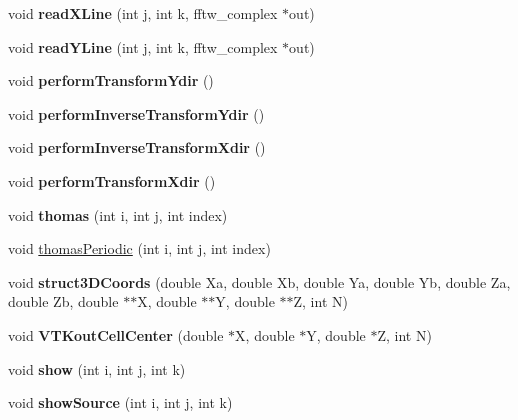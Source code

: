 \begin{DoxyCompactItemize}
\item 
\hypertarget{classFourier_ad1c692b8f1673a4dadc6d313e50be4a2}{void {\bfseries read\-X\-Line} (int j, int k, fftw\-\_\-complex $\ast$out)}\label{classFourier_ad1c692b8f1673a4dadc6d313e50be4a2}

\item 
\hypertarget{classFourier_a2bd51e53f51e649e90d9386858e8f759}{void {\bfseries read\-Y\-Line} (int j, int k, fftw\-\_\-complex $\ast$out)}\label{classFourier_a2bd51e53f51e649e90d9386858e8f759}

\item 
\hypertarget{classFourier_a1a54dd2621780ba38c3336c4bfed4ac5}{void {\bfseries perform\-Transform\-Ydir} ()}\label{classFourier_a1a54dd2621780ba38c3336c4bfed4ac5}

\item 
\hypertarget{classFourier_aeae4df419baa831f440cc4c0e5287c18}{void {\bfseries perform\-Inverse\-Transform\-Ydir} ()}\label{classFourier_aeae4df419baa831f440cc4c0e5287c18}

\item 
\hypertarget{classFourier_a2c0b90f7b858848a6890e6803e45116a}{void {\bfseries perform\-Inverse\-Transform\-Xdir} ()}\label{classFourier_a2c0b90f7b858848a6890e6803e45116a}

\item 
\hypertarget{classFourier_a41a47f2ab875bbc6664d456fed64284d}{void {\bfseries perform\-Transform\-Xdir} ()}\label{classFourier_a41a47f2ab875bbc6664d456fed64284d}

\item 
\hypertarget{classFourier_ac5285609fa1af3b722c9881994f9626d}{void {\bfseries thomas} (int i, int j, int index)}\label{classFourier_ac5285609fa1af3b722c9881994f9626d}

\item 
void \hyperlink{classFourier_ad64563559b45e05bb52babb0de43be9e}{thomas\-Periodic} (int i, int j, int index)
\item 
\hypertarget{classFourier_abd4fc72b93d3fa99ff8e42ad9847291d}{void {\bfseries struct3\-D\-Coords} (double Xa, double Xb, double Ya, double Yb, double Za, double Zb, double $\ast$$\ast$X, double $\ast$$\ast$Y, double $\ast$$\ast$Z, int N)}\label{classFourier_abd4fc72b93d3fa99ff8e42ad9847291d}

\item 
\hypertarget{classFourier_a1426338be6f9c689e0f6aefdae64535d}{void {\bfseries V\-T\-Kout\-Cell\-Center} (double $\ast$X, double $\ast$Y, double $\ast$Z, int N)}\label{classFourier_a1426338be6f9c689e0f6aefdae64535d}

\item 
\hypertarget{classFourier_ae3a5049705d07c80249dbcd172fb2059}{void {\bfseries show} (int i, int j, int k)}\label{classFourier_ae3a5049705d07c80249dbcd172fb2059}

\item 
\hypertarget{classFourier_ace03aa6f48d433b00d13850b82d8dfc3}{void {\bfseries show\-Source} (int i, int j, int k)}\label{classFourier_ace03aa6f48d433b00d13850b82d8dfc3}

\end{DoxyCompactItemize}
